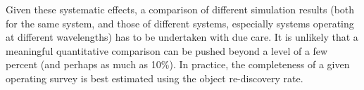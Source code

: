 Given these systematic effects, a comparison of different simulation results (both for the same system,
and those of different systems, especially systems operating at different wavelengths) has to be undertaken
with due care. It is unlikely that a meaningful quantitative comparison can be pushed beyond a level
of a few percent (and perhaps as much as 10\%). In practice, the completeness of a given operating survey
is best estimated using the object re-discovery rate. 

